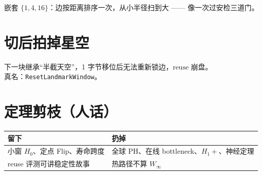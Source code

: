 嵌套 $\{1,4,16\}$：边按距离排序一次，从小半径扫到大 —— 像一次过安检三道门。

\section{切后拍掉星空}

\begin{pitfall}[不拍掉]
下一块继承``半截天空''，1 字节移位后无法重新锁边，$\mathrm{reuse}$ 崩盘。\\
真名：\texttt{ResetLandmarkWindow}。
\end{pitfall}

\section{定理剪枝（人话）}

\begin{center}
\begin{tabular}{@{}lp{6.5cm}@{}}
\toprule
留下 & 扔掉 \\
\midrule
小窗 $H_0$、定点 Flip、寿命跨度 & 全球 PH、在线 bottleneck、$H_1+$、神经定理 \\
reuse 评测可讲稳定性故事 & 热路径不算 $W_\infty$ \\
\bottomrule
\end{tabular}
\end{center}
